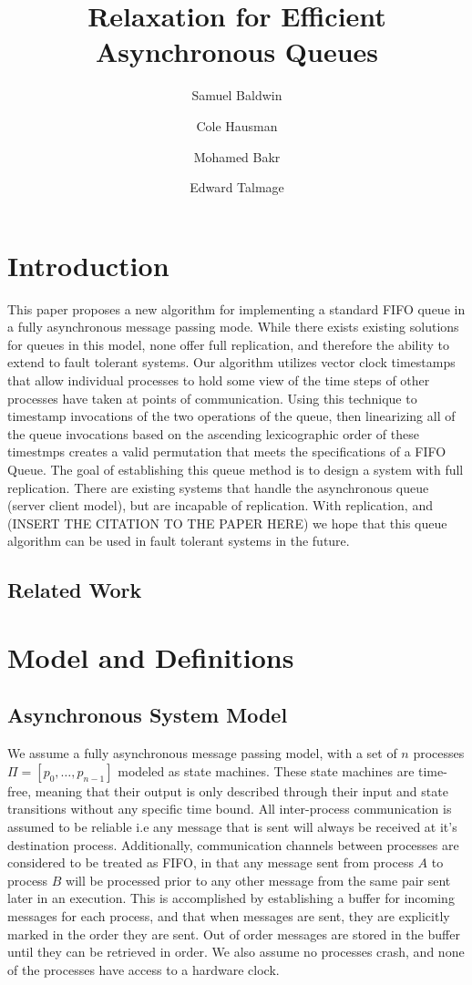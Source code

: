 \documentclass[a4paper,USenglish]{lipics-v2021} %
\title{Relaxation for Efficient Asynchronous Queues}
\author{Samuel Baldwin}{Bucknell University, USA}{}{https://orcid.org/0000-0002-1825-0097}{}
\author{Cole Hausman}{Bucknell University, USA}{}{[orcid]}{}
\author{Mohamed Bakr}{Bucknell University, USA}{}{ORCID}{}
\author{Edward Talmage}{Bucknell Univserity, USA}{elt006@bucknell.edu}{ORCID}{}
\begin{document}
\maketitle

\section{Introduction}

This paper proposes a new algorithm for implementing a standard FIFO queue in a fully asynchronous message passing mode. While there exists existing solutions for queues in this model, none offer full replication, and therefore the ability to extend to fault tolerant systems. Our algorithm utilizes vector clock timestamps that allow individual processes to hold some view of the time steps of other processes have taken at points of communication. Using this technique to timestamp invocations of the two operations of the queue, then linearizing all of the queue invocations based on the ascending lexicographic order of these timestmps creates a valid permutation that meets the specifications of a FIFO Queue.  The goal of establishing this queue method is to design a system with full replication. There are existing systems that handle the asynchronous queue (server client model), but are incapable of replication. With replication, and (INSERT THE CITATION TO THE PAPER HERE) we hope that this queue algorithm can be used in fault tolerant systems in the future.

\subsection{Related Work}

\section{Model and Definitions}

\subsection{Asynchronous System Model}
We assume a fully asynchronous message passing model, with a set of $n$ processes $\Pi = [p_0, \dots , p_{n-1}]$ modeled as state machines. These state machines are time-free, meaning that their output is only described through their input and state transitions without any specific time bound. All inter-process communication is assumed to be reliable i.e any message that is sent will always be received at it’s destination process.  Additionally, communication channels between processes are considered to be treated as FIFO, in that any message sent from process $A$ to process $B$ will be processed prior to any other message from the same pair sent later in an execution. This is accomplished by establishing a buffer for incoming messages for each process, and that when messages are sent, they are explicitly marked in the order they are sent. Out of order messages are stored in the buffer until they can be retrieved in order.  We also assume no processes crash, and none of the processes have access to a hardware clock.
\end{document}

